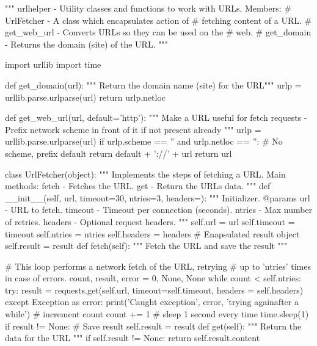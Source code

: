 \begin{VerbatimBold}
"""
urlhelper - Utility classes and functions to work with URLs.
Members:
# UrlFetcher - A class which encapsulates action of
# fetching content of a URL.
# get_web_url - Converts URLs so they can be used on the
# web.
# get_domain - Returns the domain (site) of the URL.
"""

import urllib
import time


def get_domain(url):
    """ Return the domain name (site) for the URL"""
    urlp = urllib.parse.urlparse(url)
    return urlp.netloc

def get_web_url(url, default='http'):
    """ Make a URL useful for fetch requests
    - Prefix network scheme in front of it if not present already
    """
    urlp = urllib.parse.urlparse(url)
    if urlp.scheme == '' and urlp.netloc == '':
        # No scheme, prefix default
        return default + '://' + url
    return url

class UrlFetcher(object):
    """ Implements the steps of fetching a URL.
    Main methods:
    fetch - Fetches the URL.
    get - Return the URLs data.
    """
    def __init__(self, url, timeout=30, ntries=3, headers={}):
        """ Initializer.
        @params
            url - URL to fetch.
            timeout - Timeout per connection (seconds).
            ntries - Max number of retries.
            headers - Optional request headers.
        """ 
        self.url = url
        self.timeout = timeout
        self.ntries = ntries
        self.headers = headers
        # Enapsulated result object
        self.result = result
    def fetch(self):
        """ Fetch the URL and save the result """
        
        # This loop performs a network fetch of the URL, retrying
        # up to 'ntries' times in case of errors.
        count, result, error = 0, None, None
        while count < self.ntries:
            try:
                result = requests.get(self.url,
                timeout=self.timeout,
                headers = self.headers)
            except Exception as error:
                print('Caught exception', error, 'trying againafter a while')
                # increment count
                count += 1
                # sleep 1 second every time
                time.sleep(1)
        if result != None:
            # Save result
            self.result = result
    def get(self):
        """ Return the data for the URL """
        if self.result != None:
            return self.result.content
\end{VerbatimBold}